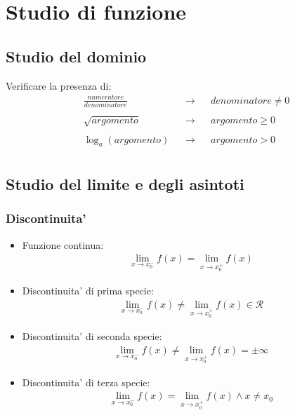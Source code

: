 \documentclass[a4paper]{article}
\begin{document}
	
	
	\newpage
	\section{Studio di funzione}
		\subsection{Studio del dominio}
		Verificare la presenza di:\\
		\begin{align*}
			&\frac{numeratore}{denominatore} & &\to & &denominatore \ne 0\\\\
			&\sqrt{argomento}				 & &\to & &argomento \ge 0\\\\
			&\log_{a}{(argomento)}			 & &\to & &argomento > 0\\
		\end{align*}
		
		\subsection{Studio del limite e degli asintoti}
		\subsubsection{Discontinuita'}
		\begin{itemize}
			\item  Funzione continua:
			\begin{align*}
			\lim\limits_{x \to x_0^-} f(x) = \lim\limits_{x \to x_0^+} f(x)
			\end{align*}
			\item  Discontinuita' di prima specie:
			\begin{align*}
			\lim\limits_{x \to x_0^-} f(x) \ne \lim\limits_{x \to x_0^+} f(x) \in \mathcal{R}
			\end{align*}
			\item  Discontinuita' di seconda specie:
			\begin{align*}
			\lim\limits_{x \to x_0^-} f(x) \ne \lim\limits_{x \to x_0^+} f(x) = \pm \infty
			\end{align*}
			\item Discontinuita' di terza specie:
			\begin{align*}
			\lim\limits_{x \to x_0^-} f(x) = \lim\limits_{x \to x_0^+} f(x) \wedge x \ne x_0
			\end{align*}
			
		\end{itemize}
		
\end{document}
